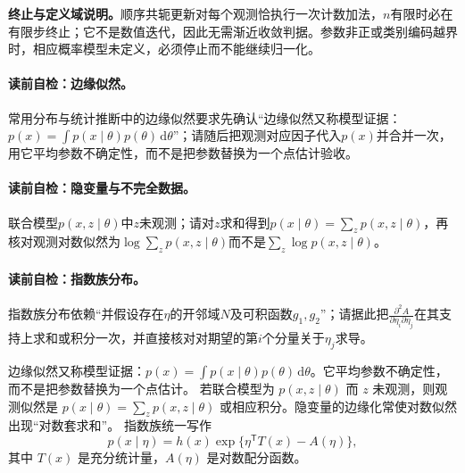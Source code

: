 \textbf{终止与定义域说明。}顺序共轭更新对每个观测恰执行一次计数加法，$n$有限时必在有限步终止；它不是数值迭代，因此无需渐近收敛判据。参数非正或类别编码越界时，相应概率模型未定义，必须停止而不能继续归一化。


\paragraph{读前自检：边缘似然。}常用分布与统计推断中的边缘似然要求先确认“边缘似然又称模型证据：$p(x)=\int p(x\mid\theta)p(\theta)\,\mathrm d\theta$”；请随后把观测对应因子代入$p(x)$并合并一次，用它平均参数不确定性，而不是把参数替换为一个点估计验收。\par
\paragraph{读前自检：隐变量与不完全数据。}联合模型$p(x,z\mid\theta)$中$z$未观测；请对$z$求和得到$p(x\mid\theta)=\sum_zp(x,z\mid\theta)$，再核对观测对数似然为$\log\sum_zp(x,z\mid\theta)$而不是$\sum_z\log p(x,z\mid\theta)$。\par
\paragraph{读前自检：指数族分布。}指数族分布依赖“并假设存在$\eta$的开邻域$N$及可积函数$g_1,g_2$”；请据此把$\frac{\partial^2A}{\partial\eta_i\partial\eta_j}$在其支持上求和或积分一次，并直接核对对期望的第$i$个分量关于$\eta_j$求导。\par

边缘似然又称模型证据：$p(x)=\int p(x\mid\theta)p(\theta)\,\mathrm d\theta$。它平均参数不确定性，而不是把参数替换为一个点估计。
若联合模型为 $p(x,z\mid\theta)$ 而 $z$ 未观测，则观测似然是 $p(x\mid\theta)=\sum_zp(x,z\mid\theta)$ 或相应积分。隐变量的边缘化常使对数似然出现“对数套求和”。
指数族统一写作
\[
p(x\mid\eta)=h(x)\exp\{\eta^{\mathsf T}T(x)-A(\eta)\},
\]
其中 $T(x)$ 是充分统计量，$A(\eta)$ 是对数配分函数。


